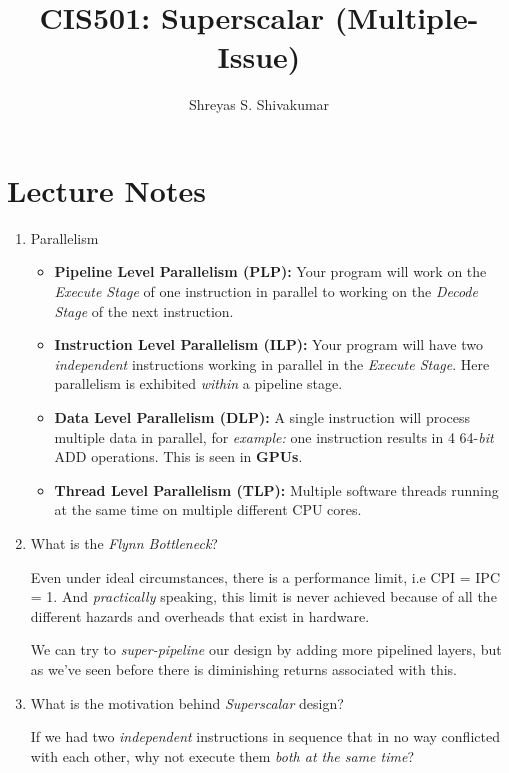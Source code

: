 \documentclass[12pt]{article}
\title{CIS501: Superscalar (Multiple-Issue)}
\author[1]{Shreyas S. Shivakumar}
\newenvironment{QandA}{\begin{enumerate}[label=\bfseries\arabic*.]\bfseries}
                      {\end{enumerate}}
\newenvironment{answered}{\par\quad\normalfont}{}
\begin{document}
\maketitle

\section{Lecture Notes}

\begin{QandA}
\item Parallelism
\begin{answered}
\vspace{-0.85cm}
\begin{itemize}
    \item \textbf{Pipeline Level Parallelism (PLP):} Your program will work on the \textit{Execute Stage} of one instruction in parallel to working on the \textit{Decode Stage} of the next instruction.
    \item \textbf{Instruction Level Parallelism (ILP):} Your program will have two \textit{independent} instructions working in parallel in the \textit{Execute Stage}. Here parallelism is exhibited \textit{within} a pipeline stage. 
    \item \textbf{Data Level Parallelism (DLP):} A single instruction will process multiple data in parallel, for \textit{example:} one instruction results in 4 64-\textit{bit} ADD operations. This is seen in \textbf{GPUs}.
    \item \textbf{Thread Level Parallelism (TLP):} Multiple software threads running at the same time on multiple different CPU cores. 
\end{itemize}
\end{answered}

\item What is the \textit{Flynn Bottleneck}?
\begin{answered}
Even under ideal circumstances, there is a performance limit, i.e CPI = IPC = 1. And \textit{practically} speaking, this limit is never achieved because of all the different hazards and overheads that exist in hardware. 

\quad We can try to \textit{super-pipeline} our design by adding more pipelined layers, but as we've seen before there is diminishing returns associated with this.
\end{answered}

\item What is the motivation behind \textit{Superscalar} design?
\begin{answered}
If we had two \textit{independent} instructions in sequence that in no way conflicted with each other, why not execute them \textit{both at the same time}?


\end{answered}
\end{QandA}
\end{document}
